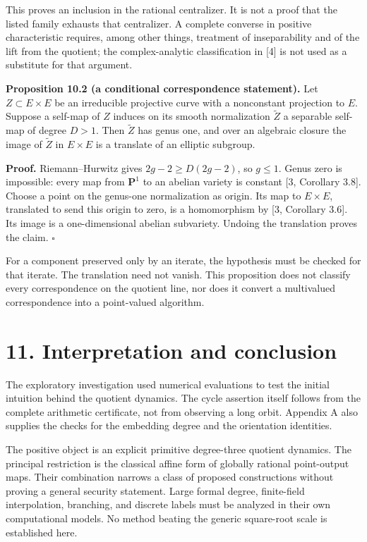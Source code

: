 \documentclass[
  11pt,
  a4paper,
]{article}
\begin{document}
This proves an inclusion in the rational centralizer. It is not a proof
that the listed family exhausts that centralizer. A complete converse in
positive characteristic requires, among other things, treatment of
inseparability and of the lift from the quotient; the complex-analytic
classification in {[}4{]} is not used as a substitute for that argument.

\textbf{Proposition 10.2 (a conditional correspondence statement).} Let
\(Z\subset E\times E\) be an irreducible projective curve with a
nonconstant projection to \(E\). Suppose a self-map of \(Z\) induces on
its smooth normalization \(\widetilde Z\) a separable self-map of degree
\(D>1\). Then \(\widetilde Z\) has genus one, and over an algebraic
closure the image of \(\widetilde Z\) in \(E\times E\) is a translate of
an elliptic subgroup.

\textbf{Proof.} Riemann--Hurwitz gives \(2g-2\geq D(2g-2)\), so
\(g\leq1\). Genus zero is impossible: every map from \(\mathbf P^1\) to
an abelian variety is constant {[}3, Corollary 3.8{]}. Choose a point on
the genus-one normalization as origin. Its map to \(E\times E\),
translated to send this origin to zero, is a homomorphism by {[}3,
Corollary 3.6{]}. Its image is a one-dimensional abelian subvariety.
Undoing the translation proves the claim. \(\square\)

For a component preserved only by an iterate, the hypothesis must be
checked for that iterate. The translation need not vanish. This
proposition does not classify every correspondence on the quotient line,
nor does it convert a multivalued correspondence into a point-valued
algorithm.

\section{11. Interpretation and
conclusion}\label{interpretation-and-conclusion}

The exploratory investigation used numerical evaluations to test the
initial intuition behind the quotient dynamics. The cycle assertion
itself follows from the complete arithmetic certificate, not from
observing a long orbit. Appendix A also supplies the checks for the
embedding degree and the orientation identities.

The positive object is an explicit primitive degree-three quotient
dynamics. The principal restriction is the classical affine form of
globally rational point-output maps. Their combination narrows a class
of proposed constructions without proving a general security statement.
Large formal degree, finite-field interpolation, branching, and discrete
labels must be analyzed in their own computational models. No method
beating the generic square-root scale is established here.
\end{document}
